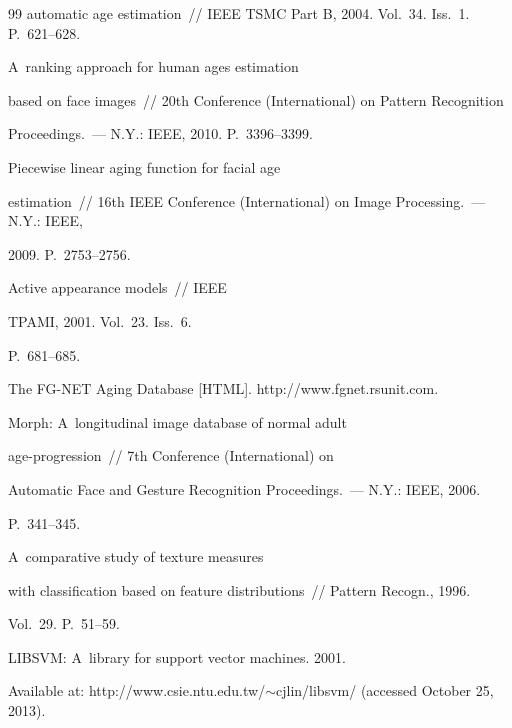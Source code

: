{{\begin{thebibliography}{99}
automatic age estimation~/\!\!/ IEEE TSMC Part B, 2004. Vol.~34. Iss.~1. P.~621--628.






 A~ranking approach for human ages estimation

based on face images~/\!\!/ 20th Conference (International) on Pattern Recognition

Proceedings.~--- N.Y.:  IEEE, 2010. P.~3396--3399.




 Piecewise linear aging function for facial age

estimation~/\!\!/ 16th IEEE Conference (International) on Image Processing.~--- N.Y.: IEEE,

2009. P.~2753--2756.




 Active appearance models~/\!\!/ IEEE

TPAMI, 2001. Vol.~23. Iss.~6.

P.~681--685.




The FG-NET Aging Database [HTML]. {\sf http://www.fgnet.rsunit.com}.








 Morph: A~longitudinal image database of normal adult

age-progression~/\!\!/ 7th Conference (International) on

Automatic Face and Gesture Recognition Proceedings.~--- N.Y.: IEEE, 2006.

P.~341--345.




 A~comparative study of texture measures

with classification based on feature distributions~/\!\!/ Pattern Recogn., 1996.

Vol.~29. P.~51--59.




 LIBSVM: A~library for support vector machines. 2001.

Available at: {\sf http://www.csie.ntu.edu.tw/$\sim$cjlin/libsvm/} (accessed October 25, 2013).



 \end{thebibliography}

} }



